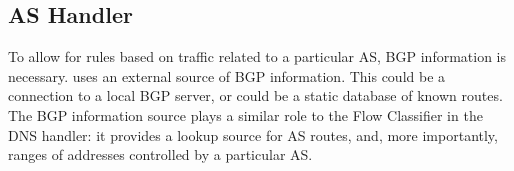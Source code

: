 \begin{comment}



\end{comment}

\subsection{AS Handler}
To allow for rules based on traffic related to a particular AS, BGP information is necessary. \system{} uses an external source of BGP information. This could be a connection to a local BGP server, or could be a static database of known routes. The BGP information source plays a similar role to the Flow Classifier in the DNS handler: it provides a lookup source for AS routes, and, more importantly, ranges of addresses controlled by a particular AS.

